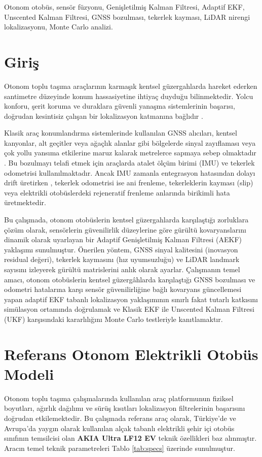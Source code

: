 ﻿\documentclass[conference]{IEEEtran}
\begin{document}
\begin{IEEEkeywords}
Otonom otobüs, sensör füzyonu, Genişletilmiş Kalman Filtresi, Adaptif EKF, Unscented Kalman Filtresi, GNSS bozulması, tekerlek kayması, LiDAR nirengi lokalizasyonu, Monte Carlo analizi.
\end{IEEEkeywords}

\section{Giriş}
Otonom toplu taşıma araçlarının karmaşık kentsel güzergahlarda hareket ederken santimetre düzeyinde konum hassasiyetine ihtiyaç duyduğu bilinmektedir. Yolcu konforu, şerit koruma ve duraklara güvenli yanaşma sistemlerinin başarısı, doğrudan kesintisiz çalışan bir lokalizasyon katmanına bağlıdır \cite{bresson2017localization}. 

Klasik araç konumlandırma sistemlerinde kullanılan GNSS alıcıları, kentsel kanyonlar, alt geçitler veya ağaçlık alanlar gibi bölgelerde sinyal zayıflaması veya çok yollu yansıma etkilerine maruz kalarak metrelerce sapmaya sebep olmaktadır \cite{groves2013principles}. Bu bozulmayı telafi etmek için araçlarda atalet ölçüm birimi (IMU) ve tekerlek odometrisi kullanılmaktadır. Ancak IMU zamanla entegrasyon hatasından dolayı drift üretirken \cite{groves2013principles}, tekerlek odometrisi ise ani frenleme, tekerleklerin kayması (slip) veya elektrikli otobüslerdeki rejeneratif frenleme anlarında birikimli hata üretmektedir.

Bu çalışmada, otonom otobüslerin kentsel güzergahlarda karşılaştığı zorluklara çözüm olarak, sensörlerin güvenilirlik düzeylerine göre gürültü kovaryanslarını dinamik olarak uyarlayan bir Adaptif Genişletilmiş Kalman Filtresi (AEKF) yaklaşımı sunulmuştur. Önerilen yöntem, GNSS sinyal kalitesini (inovasyon residual değeri), tekerlek kaymasını (hız uyumsuzluğu) ve LiDAR landmark sayısını izleyerek gürültü matrislerini anlık olarak ayarlar. Çalışmanın temel amacı, otonom otobüslerin kentsel güzergâhlarda karşılaştığı GNSS bozulması ve odometri hatalarına karşı sensör güvenilirliğine bağlı kovaryans güncellemesi yapan adaptif EKF tabanlı lokalizasyon yaklaşımının sınırlı fakat tutarlı katkısını simülasyon ortamında doğrulamak ve Klasik EKF ile Unscented Kalman Filtresi (UKF) karşısındaki kararlılığını Monte Carlo testleriyle kanıtlamaktır.

\section{Referans Otonom Elektrikli Otobüs Modeli}
Otonom toplu taşıma çalışmalarında kullanılan araç platformunun fiziksel boyutları, ağırlık dağılımı ve sürüş kısıtları lokalizasyon filtrelerinin başarısını doğrudan etkilemektedir. Bu çalışmada referans araç olarak, Türkiye'de ve Avrupa'da yaygın olarak kullanılan alçak tabanlı elektrikli şehir içi otobüs sınıfının temsilcisi olan \textbf{AKIA Ultra LF12 EV} teknik özellikleri baz alınmıştır. Aracın temel teknik parametreleri Tablo \ref{tab:specs} üzerinde sunulmuştur.
\end{document}
